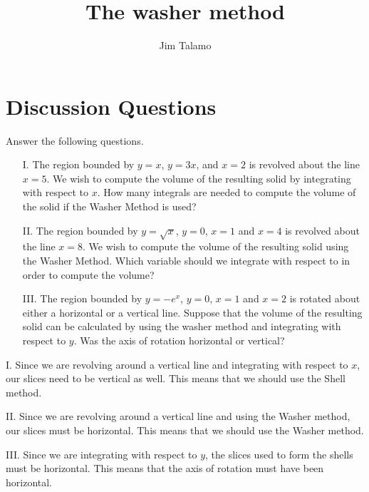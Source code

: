 \documentclass[handout]{ximera}
\author{Jim Talamo}
\title[]{The washer method}
\begin{document}
\begin{abstract}
\end{abstract}
\maketitle

\vspace{-0.9in}

\section{Discussion Questions}

\begin{problem}
Answer the following questions. 
\begin{enumerate}
\item[I.] The region bounded by $y=x$, $y=3x$, and $x=2$ is revolved about the line $x=5$. We wish to compute the volume of the resulting solid by integrating with respect to $x$. How many integrals are needed to compute the volume of the solid if the Washer Method is used?

\item[II.]  The region bounded by $y=\sqrt{x}$, $y=0$, $x=1$ and $x=4$ is revolved about the line $x=8$.  We wish to compute the volume of the resulting solid using the Washer Method. Which variable should we integrate with respect to in order to compute the volume?

\item[III.] The region bounded by $y=-e^x$, $y=0$, $x=1$ and $x=2$ is rotated about either a horizontal or a vertical line. Suppose that the volume of the resulting solid can be calculated by using the washer method and integrating with respect to $y$. Was the axis of rotation horizontal or vertical?
\end{enumerate}
\end{problem}

\begin{freeResponse}
I. Since we are revolving around a vertical line and integrating with respect to $x$, our slices need to be vertical as well. This means that we should use the Shell method.

II. Since we are revolving around a vertical line and using the Washer method, our slices must be horizontal. This means that we should use the Washer method.

III. Since we are integrating with respect to $y$, the slices used to form the shells must be horizontal. This means that the axis of rotation must have been horizontal.
\end{freeResponse}
\end{document}
